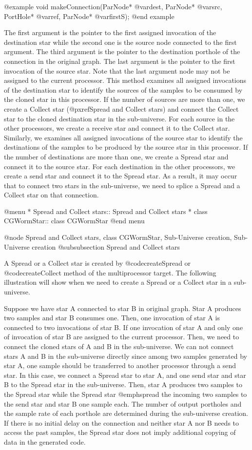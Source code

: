 @example
void makeConnection(ParNode* @var{dest}, ParNode* @var{src}, PortHole* @var{ref}, ParNode* @var{firstS});
@end example

The first argument is the pointer to the first assigned invocation 
of the destination star while the second one is the source node connected
to the first argument. The third argument is the pointer to the destination
porthole of the connection in the original graph. The last argument is
the pointer to the first invocation of the source star. Note that the last
argument node may not be assigned to the current processor.
This method examines all assigned invocations of the destination star 
to identify the sources of the samples to be consumed by the cloned star
in this processor. If the number of sources are more than one, we
create a Collect star (@pxref{Spread and  Collect stars}) and connect the
Collect star to the cloned destination star in the sub-universe. For
each source in the other processors, we create a receive star and 
connect it to the Collect star. Similarly, we examines all assigned
invocations of the source star to identify the destinations of the samples
to be produced by the source star in this processor. If the number of
destinations are more than one, we create a Spread star and connect it
to the source star. For each destination in the other processors, we create
a send star and connect it to the Spread star. As a result, it may occur
that to connect two stars in the sub-universe, we need to splice a Spread 
and a Collect star on that connection. 

@menu
* Spread and Collect stars::		Spread and Collect stars
* class CGWormStar::			class CGWormStar
@end menu

@node Spread and Collect stars, class CGWormStar, Sub-Universe creation, Sub-Universe creation
@subsubsection Spread and Collect stars

A Spread or a Collect star is created by @code{createSpread} or
@code{createCollect} method of the multiprocessor target. The following
illustration will show when we need to create a Spread or a Collect star
in a sub-universe.

Suppose we have star A connected to star B in original graph. Star A
produces two samples and star B consumes one. Then, one invocation
of star A is connected to two invocations of star B. If one invocation of
star A and only one of invocation of star B are assigned to the
current processor. Then, we need to connect the cloned stars of A and B
in the sub-universe. We can not connect stars A and B in the sub-universe
directly since among two samples generated by star A, one sample should be
transferred to another processor through a send star. In this case, we
connect a Spread star to star A, and one send star and star B to the
Spread star in the sub-universe. Then, star A produces two samples to
the Spread star while the Spread star @emph{spread} the incoming two samples
to the send star and star B one sample each. The number of output portholes
and the sample rate of each porthole are determined during the
sub-universe creation. If there is no initial delay on the connection and
neither star A nor B needs to access the past samples, the Spread star
does not imply additional copying of data in the generated code.

